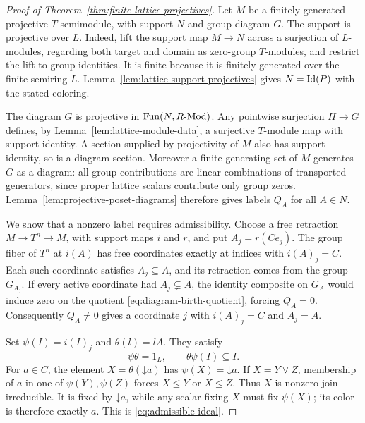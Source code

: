 \begin{proof}[Proof of Theorem~\ref{thm:finite-lattice-projectives}]
Let $M$ be a finitely generated projective $T$-semimodule, with support
$N$ and group diagram $G$. The support is projective over $L$.
Indeed, lift the support map $M\to N$ across a surjection of $L$-modules,
regarding both target and domain as zero-group $T$-modules, and restrict
the lift to group identities. It is finite because it is finitely
generated over the finite semiring $L$. Lemma~\ref{lem:lattice-support-projectives}
gives $N=\operatorname{Id}(P)$ with the stated coloring.

The diagram $G$ is projective in $\operatorname{Fun}(N,R\text{-}\mathrm{Mod})$.
Any pointwise surjection $H\to G$ defines, by
Lemma~\ref{lem:lattice-module-data}, a surjective $T$-module map with
support identity. A section supplied by projectivity of $M$ also has
support identity, so is a diagram section. Moreover a finite generating
set of $M$ generates $G$ as a diagram: all group contributions are
linear combinations of transported generators, since proper lattice
scalars contribute only group zeros. Lemma~\ref{lem:projective-poset-diagrams}
therefore gives labels $Q_A$ for all $A\in N$.

We show that a nonzero label requires admissibility. Choose a free
retraction $M\longrightarrow T^n\longrightarrow M$, with support
maps $i$ and $r$, and put $A_j=r(Ce_j)$. The group fiber of $T^n$
at $i(A)$ has free coordinates exactly at indices with $i(A)_j=C$.
Each such coordinate satisfies $A_j\subseteq A$, and its retraction
comes from the group $G_{A_j}$. If every active coordinate had
$A_j\subsetneq A$, the identity composite on $G_A$ would induce zero
on the quotient \eqref{eq:diagram-birth-quotient}, forcing $Q_A=0$.
Consequently $Q_A\ne0$ gives a coordinate $j$ with
$i(A)_j=C$ and $A_j=A$.

Set $\psi(I)=i(I)_j$ and $\theta(l)=lA$. They satisfy
\[
 \psi\theta=1_L,\qquad \theta\psi(I)\subseteq I.
\]
For $a\in C$, the element $X=\theta(\mathord\downarrow a)$ has
$\psi(X)=\mathord\downarrow a$. If $X=Y\vee Z$, membership of $a$
in one of $\psi(Y),\psi(Z)$ forces $X\le Y$ or $X\le Z$.
Thus $X$ is nonzero join-irreducible. It is fixed by
$\mathord\downarrow a$, while any scalar fixing $X$ must fix
$\psi(X)$; its color is therefore exactly $a$.
This is \eqref{eq:admissible-ideal}.


\end{proof}
